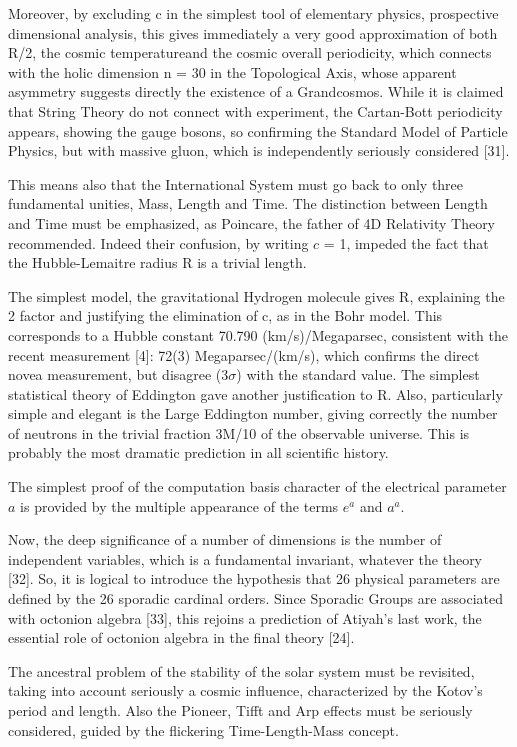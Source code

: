 \documentclass[twoside,draft]{article}
\begin{document}
\begin{sloppypar}
{Moreover, by excluding c in the simplest tool of elementary physics, prospective dimensional
analysis, this gives immediately a very good approximation of both R/2, the cosmic temperatureand the cosmic overall periodicity, which connects with the holic dimension n = 30 in the
Topological Axis, whose apparent asymmetry suggests directly the existence of a Grandcosmos.
While it is claimed that String Theory do not connect with experiment, the Cartan-Bott periodicity
appears, showing the gauge bosons, so confirming the Standard Model of Particle Physics, but with
massive gluon, which is independently seriously considered [31].

This means also that the International System must go back to only three fundamental unities,
Mass, Length and Time. The distinction between Length and Time must be emphasized, as
Poincare, the father of 4D Relativity Theory recommended. Indeed their confusion, by writing $c$ =
1, impeded the fact that the Hubble-Lemaitre radius R is a trivial length.

The simplest model, the gravitational Hydrogen molecule gives R, explaining the 2 factor and
justifying the elimination of c, as in the Bohr model. This corresponds to a Hubble constant 70.790
(km/s)/Megaparsec, consistent with the recent measurement [4]: 72(3) Megaparsec/(km/s), which
confirms the direct novea measurement, but disagree (3$\sigma$) with the standard value.
The simplest statistical theory of Eddington gave another justification to R. Also, particularly
simple and elegant is the Large Eddington number, giving correctly the number of neutrons in the
trivial fraction 3M/10 of the observable universe. This is probably the most dramatic prediction in
all scientific history.

The simplest proof of the computation basis character of the electrical parameter $a$ is provided
by the multiple appearance of the terms $e^{a}$ and $a^{a}$.

Now, the deep significance of a number of dimensions is the number of independent variables,
which is a fundamental invariant, whatever the theory [32]. So, it is logical to introduce the
hypothesis that 26 physical parameters are defined by the 26 sporadic cardinal orders. Since
Sporadic Groups are associated with octonion algebra [33], this rejoins a prediction of Atiyah's last
work, the essential role of octonion algebra in the final theory [24].

The ancestral problem of the stability of the solar system must be revisited, taking into account
seriously a cosmic influence, characterized by the Kotov's period and length. Also the Pioneer, Tifft
and Arp effects must be seriously considered, guided by the flickering Time-Length-Mass concept.

}
\end{sloppypar}
\end{document}
